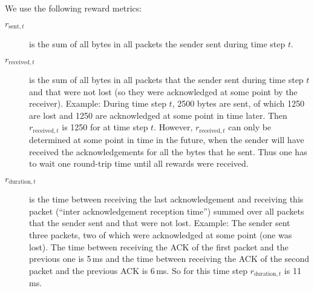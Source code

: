 \documentclass[newfonts=false,format=sigconf,10pt,letterpaper]{acmart}
\begin{document}
We use the following reward metrics: 
\begin{description}
\item[$\textit{r}_{\text{sent},t}$] is the sum of all bytes in all packets the sender sent during time step $t$. 
\item[$\textit{r}_{\text{received},t}$] is the sum of all bytes in all packets that the sender sent during time step $t$ and that were not lost (so they were acknowledged at some point by the receiver). Example: During time step $t$, 2500 bytes are sent, of which 1250 are lost and 1250 are acknowledged at some point in time later. Then $\textit{r}_{\text{received},t}$ is 1250 for at time step $t$. However, $\textit{r}_{\text{received},t}$ can only be determined at some point in time in the future, when the sender will have received the acknowledgements for all the bytes that he sent. Thus one has to wait one round-trip time until all rewards were received. 
\item[$\textit{r}_{\text{duration},t}$] is the time between receiving the last acknowledgement and receiving this packet (``inter acknowledgement reception time'') summed over all packets that the sender sent and that were not lost. Example: The sender sent three packets, two of which were acknowledged at some point (one was lost). The time between receiving the ACK of the first packet and the previous one is 5\,ms and the time between receiving the ACK of the second packet and the previous ACK is 6\,ms. So for this time step $\textit{r}_{\text{duration},t}$ is 11\,ms.
\end{description}

\end{document}
